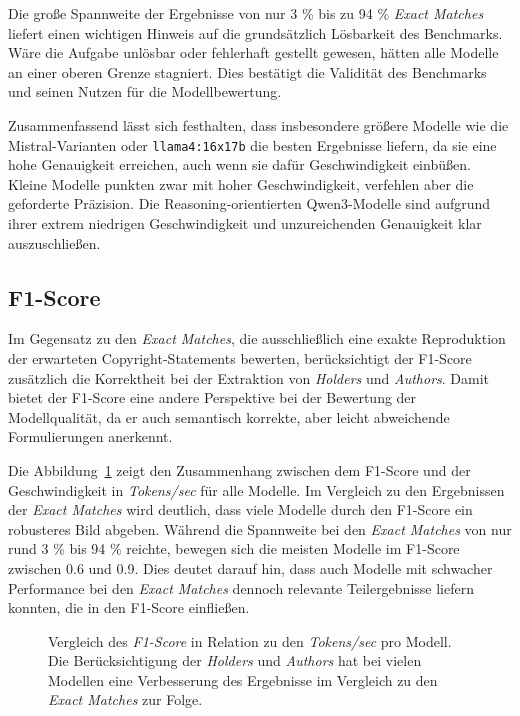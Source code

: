 Die große Spannweite der Ergebnisse von nur \num{3} \% bis zu \num{94} \% \textit{Exact Matches} liefert einen wichtigen Hinweis auf die grundsätzlich Lösbarkeit des Benchmarks.
Wäre die Aufgabe unlösbar oder fehlerhaft gestellt gewesen, hätten alle Modelle an einer oberen Grenze stagniert.
Dies bestätigt die Validität des Benchmarks und seinen Nutzen für die Modellbewertung.

Zusammenfassend lässt sich festhalten, dass insbesondere größere Modelle wie die Mistral-Varianten oder \texttt{llama4:16x17b} die besten Ergebnisse liefern, da sie eine hohe Genauigkeit erreichen, auch wenn sie dafür Geschwindigkeit einbüßen.
Kleine Modelle punkten zwar mit hoher Geschwindigkeit, verfehlen aber die geforderte Präzision.
Die Reasoning-orientierten Qwen3-Modelle sind aufgrund ihrer extrem niedrigen Geschwindigkeit und unzureichenden Genauigkeit klar auszuschließen.


\subsection{F1-Score}

Im Gegensatz zu den \textit{Exact Matches}, die ausschließlich eine exakte Reproduktion der erwarteten Copyright-Statements bewerten, berücksichtigt der F1-Score zusätzlich die Korrektheit bei der Extraktion von \textit{Holders} und \textit{Authors}.
Damit bietet der F1-Score eine andere Perspektive bei der Bewertung der Modellqualität, da er auch semantisch korrekte, aber leicht abweichende Formulierungen anerkennt.

Die Abbildung~\ref{fig:f1-overall-result} zeigt den Zusammenhang zwischen dem F1-Score und der Geschwindigkeit in \textit{Tokens/sec} für alle Modelle.
Im Vergleich zu den Ergebnissen der \textit{Exact Matches} wird deutlich, dass viele Modelle durch den F1-Score ein robusteres Bild abgeben.
Während die Spannweite bei den \textit{Exact Matches} von nur rund \num{3} \% bis \num{94} \% reichte, bewegen sich die meisten Modelle im F1-Score zwischen \num{0.6} und \num{0.9}.
Dies deutet darauf hin, dass auch Modelle mit schwacher Performance bei den \textit{Exact Matches} dennoch relevante Teilergebnisse liefern konnten, die in den F1-Score einfließen.

\begin{figure}[ht]
    \centering
    \caption{Vergleich des \textit{F1-Score} in Relation zu den \textit{Tokens/sec} pro Modell. Die Berücksichtigung der \textit{Holders} und \textit{Authors} hat bei vielen Modellen eine Verbesserung des Ergebnisse im Vergleich zu den \textit{Exact Matches} zur Folge.}
    \label{fig:f1-overall-result}
\end{figure}

